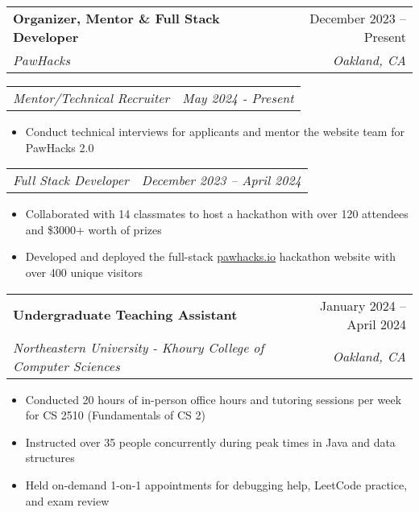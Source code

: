 \documentclass[letterpaper,11pt]{article}
\makeatletter
\newcommand{\resumeItem}[1]{
  \item\small{
    {#1 \vspace{-2pt}}
  }
}
\newcommand{\resumeSubheading}[4]{
  \vspace{-2pt}\item
    \begin{tabular*}{0.97\textwidth}[t]{l@{\extracolsep{\fill}}r}
      \textbf{#1} & #2 \\
      \textit{\small#3} & \textit{\small #4} \\
    \end{tabular*}\vspace{-7pt}
}
\newcommand{\resumeSubSubheading}[2]{
    \item
    \begin{tabular*}{0.97\textwidth}{l@{\extracolsep{\fill}}r}
      \textit{\small#1} & \textit{\small #2} \\
    \end{tabular*}\vspace{-7pt}
}
\newcommand{\resumeItemListStart}{\begin{itemize}}
\newcommand{\resumeItemListEnd}{\end{itemize}\vspace{-5pt}}
\makeatother
\begin{document}

    \resumeSubheading
      {Organizer, Mentor \& Full Stack Developer}{December 2023 -- Present}
      {PawHacks}{Oakland, CA} 

      \resumeSubSubheading
      {Mentor/Technical Recruiter}{May 2024 - Present}
      \resumeItemListStart
        \resumeItem
          {Conduct technical interviews for applicants and mentor the website team for PawHacks 2.0}
      \resumeItemListEnd

      \resumeSubSubheading
      {Full Stack Developer}{December 2023 -- April 2024}
      \resumeItemListStart
        \resumeItem{Collaborated with 14 classmates to host a hackathon with over 120 attendees and \$3000+ worth of prizes}
        \resumeItem{Developed and deployed the full-stack \underline{\href{https://pawhacks.io}{pawhacks.io}} hackathon website with over 400 unique visitors}
      \resumeItemListEnd


    \resumeSubheading
      {Undergraduate Teaching Assistant}{January 2024 -- April 2024}
      {Northeastern University - Khoury College of Computer Sciences}{Oakland, CA}
      \resumeItemListStart
        \resumeItem{Conducted 20 hours of in-person office hours and tutoring sessions per week for CS 2510 (Fundamentals of CS 2)}
        \resumeItem{Instructed over 35 people concurrently during peak times in Java and data structures}
        \resumeItem{Held on-demand 1-on-1 appointments for debugging help, LeetCode practice, and exam review}
      \resumeItemListEnd


\end{document}
